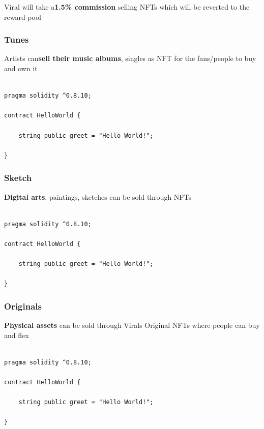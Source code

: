 \documentclass[10pt]{article}
\begin{document}
Viral will take a\textbf{1.5\% commission} selling NFTs which will be reverted to the reward pool

\subsubsection{Tunes}

Artists can\textbf{sell their music albums}, singles as NFT for the fans/people to buy and own it

\begin{lstlisting}[language=Solidity, caption={NFT Snippet To Sell Multiple Copies}]

pragma solidity ^0.8.10;

contract HelloWorld {

    string public greet = "Hello World!";
    
}
\end{lstlisting}

\subsubsection{Sketch}
\textbf{Digital arts}, paintings, sketches can be sold through NFTs

\begin{lstlisting}[language=Solidity,label={single-asset}, caption={NFT Snippet to sell single asset}]

pragma solidity ^0.8.10;

contract HelloWorld {

    string public greet = "Hello World!";
    
}
\end{lstlisting}

\subsubsection{Originals}
\textbf{Physical assets} can be sold through Viral\textsc{}s Original NFTs where people can buy and flex

\begin{lstlisting}[language=Solidity, caption={NFT Snippet to provide extra information such as Name, Address, Mobile Number, before transferring coins with end to end encryption between seller}]

pragma solidity ^0.8.10;

contract HelloWorld {

    string public greet = "Hello World!";
    
}
\end{lstlisting}
\end{document}
